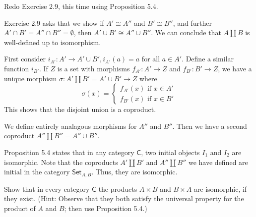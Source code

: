 \documentclass[../../master.tex]{subfiles}
\begin{document}
    \begin{problem}
      Redo Exercise 2.9, this time using Proposition 5.4.
    \end{problem}

    \begin{solution}
      Exercise 2.9 asks that we show if \(A' \cong A''\) and \(B' \cong B''\),
      and further \(A' \cap B' = A'' \cap B'' = \emptyset\),
      then \(A' \cup B' \cong A'' \cup B''\).
      We can conclude that \(A \coprod B\) is well-defined up to isomorphism.

      First consider \(i_{A'}: A' \to A' \cup B', i_{A'}(a) = a\) for all \(a \in A'\).
      Define a similar function \(i_{B'}\).
      If \(Z\) is a set with morphisms \(f_{A'}: A' \to Z\) and \(f_{B'}: B' \to Z\),
      we have a unique morphism \(\sigma: A' \coprod B' = A' \cup B' \to Z\) where
      \begin{equation*}
        \sigma(x) =
        \begin{cases}
          f_{A'}(x) \text{ if } x \in A' \\
          f_{B'}(x) \text{ if } x \in B'
        \end{cases}
      \end{equation*}
      This shows that the disjoint union is a coproduct.

      We define entirely analagous morphisms for \(A''\) and \(B''\).
      Then we have a second coproduct \(A'' \coprod B'' = A'' \cup B''\).

      Proposition 5.4 states that in any category \(\mathsf{C}\), two initial objects \(I_{1}\) and \(I_{2}\) are isomorphic.
      Note that the coproducts \(A' \coprod B'\) and \(A'' \coprod B''\) we have defined are initial in the category \(\mathsf{Set}_{A, B}\).
      Thus, they are isomorphic.
    \end{solution}

    \begin{problem}
      Show that in every category \(\mathsf{C}\) the products \(A \times B\) and \(B \times A\) are isomorphic, if they exist.
      (Hint: Observe that they both satisfy the universal property for the product of \(A\) and \(B\);
      then use Proposition 5.4.)
    \end{problem}
\end{document}
